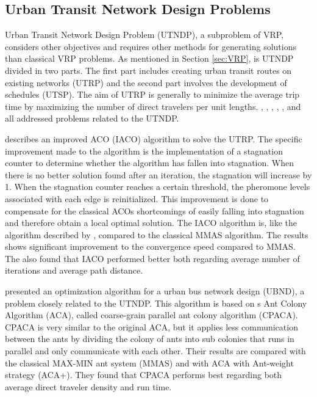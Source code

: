 \subsection{Urban Transit Network Design Problems}

Urban Transit Network Design Problem (UTNDP), a subproblem of VRP, considers other objectives and requires other methods for generating solutions than classical VRP problems. As mentioned in Section \vref{sec:VRP}, is UTNDP divided in two parts. The first part includes creating urban transit routes on existing networks (UTRP) and the second part involves the development of schedules (UTSP). The aim of UTRP is generally to minimize the average trip time by maximizing the number of direct travelers per unit lengths. \citet{yang07}, \citet{salehinejad10}, \citet{jiang10}, \citet{poorzahedy11}, \citet{nikolic14}, and \citet{kechagiopoulos14} all addressed problems related to the UTNDP.

\citet{jiang10} describes an improved ACO (IACO) algorithm to solve the UTRP. The specific improvement made to the algorithm is the implementation of a stagnation counter to determine whether the algorithm has fallen into stagnation. When there is no better solution found after an iteration, the stagnation will increase by 1. When the stagnation counter reaches a certain threshold, the pheromone levels associated with each edge is reinitialized. This improvement is done to compensate for the classical ACOs shortcomings of easily falling into stagnation and therefore obtain a local optimal solution. The IACO algorithm is, like the algorithm described by \citet{yang07}, compared to the classical MMAS algorithm. The results shows significant improvement to the convergence speed compared to MMAS. The also found that IACO performed better both regarding average number of iterations and average path distance. 

\citet{yang07} presented an optimization algorithm for a urban bus network design (UBND), a problem closely related to the UTNDP. This algorithm is based on \citet{dorigo96}s Ant Colony Algorithm (ACA), called coarse-grain parallel ant colony algorithm (CPACA). CPACA is very similar to the original ACA, but it applies less communication between the ants by dividing the colony of ants into sub colonies that runs in parallel and only communicate with each other. Their results are compared with the classical MAX-MIN ant system (MMAS)\citep{stutzle99} and with ACA with Ant-weight strategy (ACA+). They found that CPACA performs best regarding both average direct traveler density and run time. 

